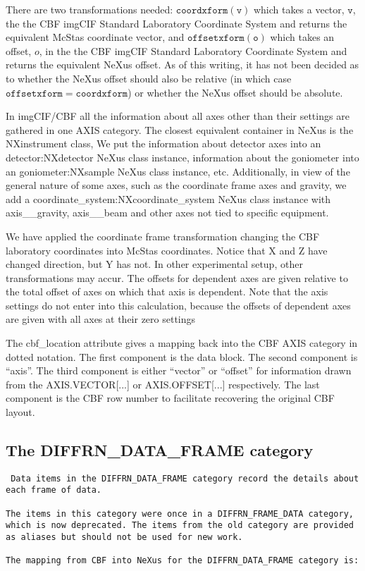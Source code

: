 \documentclass[11pt]{article}
\begin{document}
{There are two transformations needed:  $\mathtt{coordxform(v)}$ which takes a vector, $\mathtt{v}$, the
the CBF imgCIF Standard Laboratory Coordinate System and returns the equivalent
McStas coordinate vector, and $\mathtt{offsetxform(o)}$ which takes an offset, $o$, in the
the CBF imgCIF Standard Laboratory Coordinate System and returns the equivalent
NeXus offset.  As of this writing, it has not been decided as to whether the NeXus
offset should also be relative (in which case $\mathtt{offsetxform = coordxform}$) or
whether the NeXus offset should be absolute.

In imgCIF/CBF all the information about all axes other than their settings are gathered in
one AXIS category.  The closest equivalent container in NeXus is the NXinstrument class,
We put the information about detector axes into an detector:NXdetector NeXus class instance, 
information about the goniometer into an goniometer:NXsample NeXus class instance, etc.
Additionally, in view of the general nature of some axes, such as the coordinate frame
axes and gravity, we add a coordinate\_system:NXcoordinate\_system NeXus class instance with 
axis\_\_gravity, axis\_\_beam and other axes not tied to specific equipment.

We have applied the coordinate frame transformation changing
the CBF laboratory coordinates into McStas coordinates.  Notice that X and Z have changed
direction, but Y has not.   In other experimental setup, other transformations may
accur.   The offsets for dependent axes are given relative to the total
offset of axes on which that axis is dependent.  Note that the
axis settings do not enter into this calculation, because the
offsets of dependent axes are given with all axes at their
zero settings

The cbf\_location attribute gives a mapping back into the CBF AXIS category in dotted
notation.  The first component is the data block.  The second component is ``axis''.
The third component is either ``vector'' or ``offset''  for information drawn from the 
AXIS.VECTOR[...] or AXIS.OFFSET[...] respectively.  The last component is the
CBF row number to facilitate recovering the original CBF layout.


\subsection{The DIFFRN\_DATA\_FRAME category}

{\footnotesize \tt
Data items in the DIFFRN\_DATA\_FRAME category record
the details about each frame of data.\\
~~\\
The items in this category were once in a
DIFFRN\_FRAME\_DATA category, which is now deprecated.
The items from the old category are provided
as aliases but should not be used for new work.\\
~~\\
The mapping from CBF into NeXus for the DIFFRN\_DATA\_FRAME category is:

}}
\end{document}

